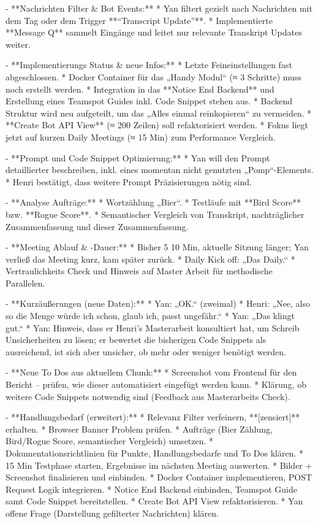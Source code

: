 - **Nachrichten Filter \& Bot Events:**  
  * Yan filtert gezielt nach Nachrichten mit dem Tag oder dem Trigger **“Transcript Update”**.  
  * Implementierte **Message Q** sammelt Eingänge und leitet nur relevante Transkript Updates weiter.  

- **Implementierungs Status \& neue Infos:**  
  * Letzte Feineinstellungen fast abgeschlossen.  
  * Docker Container für das „Handy Modul“ (≈ 3 Schritte) muss noch erstellt werden.  
  * Integration in das **Notice End Backend** und Erstellung eines Teamspot Guides inkl. Code Snippet stehen aus.  
  * Backend Struktur wird neu aufgeteilt, um das „Alles einmal reinkopieren“ zu vermeiden.  
  * **Create Bot API View** (≈ 200 Zeilen) soll refaktorisiert werden.  
  * Fokus liegt jetzt auf kurzen Daily Meetings (≈ 15 Min) zum Performance Vergleich.  

- **Prompt und Code Snippet Optimierung:**  
  * Yan will den Prompt detaillierter beschreiben, inkl. eines momentan nicht genutzten „Pomp“-Elements.  
  * Henri bestätigt, dass weitere Prompt Präzisierungen nötig sind.  

- **Analyse Aufträge:**  
  * Wortzählung „Bier“.  
  * Testläufe mit **Bird Score** bzw. **Rogue Score**.  
  * Semantischer Vergleich von Transkript, nachträglicher Zusammenfassung und dieser Zusammenfassung.  

- **Meeting Ablauf \& -Dauer:**  
  * Bisher 5 10 Min, aktuelle Sitzung länger; Yan verließ das Meeting kurz, kam später zurück.  
  * Daily Kick off: „Das Daily.“  
  * Vertraulichkeits Check und Hinweis auf Master Arbeit für methodische Parallelen.  

- **Kurzäußerungen (neue Daten):**  
  * Yan: „OK.“ (zweimal)  
  * Henri: „Nee, also so die Menge würde ich schon, glaub ich, passt ungefähr.“  
  * Yan: „Das klingt gut.“  
  * Yan: Hinweis, dass er Henri’s Masterarbeit konsultiert hat, um Schreib Unsicherheiten zu lösen; er bewertet die bisherigen Code Snippets als ausreichend, ist sich aber unsicher, ob mehr oder weniger benötigt werden.  

- **Neue To Dos aus aktuellem Chunk:**  
  * Screenshot vom Frontend für den Bericht – prüfen, wie dieser automatisiert eingefügt werden kann.  
  * Klärung, ob weitere Code Snippets notwendig sind (Feedback aus Masterarbeits Check).  

- **Handlungsbedarf (erweitert):**  
  * Relevanz Filter verfeinern, **[zensiert]** erhalten.  
  * Browser Banner Problem prüfen.  
  * Aufträge (Bier Zählung, Bird/Rogue Score, semantischer Vergleich) umsetzen.  
  * Dokumentationsrichtlinien für Punkte, Handlungsbedarfe und To Dos klären.  
  * 15 Min Testphase starten, Ergebnisse im nächsten Meeting auswerten.  
  * Bilder + Screenshot finalisieren und einbinden.  
  * Docker Container implementieren, POST Request Logik integrieren.  
  * Notice End Backend einbinden, Teamspot Guide samt Code Snippet bereitstellen.  
  * Create Bot API View refaktorisieren.  
  * Yan offene Frage (Darstellung gefilterter Nachrichten) klären.  


